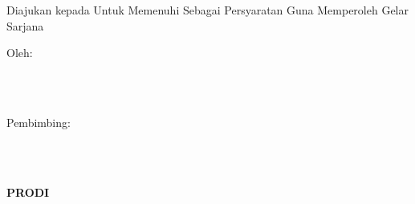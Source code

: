
\newpage
{}
\begin{center}
    \begin{doublespace}
        \textbf{\large{\MakeUppercase{\judulid}}}\\[2.5cm]
    \end{doublespace}

    \textbf{\MakeUppercase{\large{\tipe}}}\\[0.5cm]
    \begin{onehalfspace}
        Diajukan kepada {\fakultas} {\universitas} Untuk Memenuhi Sebagai Persyaratan Guna Memperoleh Gelar Sarjana\\[1.8cm]
    \end{onehalfspace}

    \large Oleh: \\
    \begin{onehalfspace}
        \large{\penulis} \\
        \large{\nim}\\[1.5cm]
    \end{onehalfspace}
    \vspace{1.5cm}

    \large Pembimbing: \\
    \begin{onehalfspace}
        \large{\pembimbingsatu} \\
        \large{\pembimbingdua} \\
    \end{onehalfspace}

    \vfill

    \textbf{\large \MakeUppercase{Prodi \prodi}}\\
    \textbf{\large \MakeUppercase{\fakultas}}\\
    \textbf{\large \MakeUppercase{\universitas}}\\
    \textbf{\large \the\year{}}\\
\end{center}
